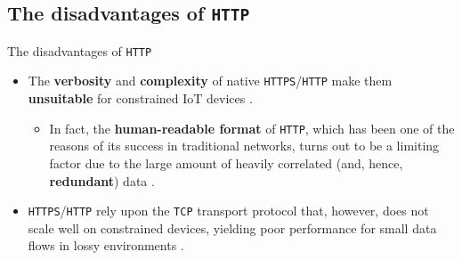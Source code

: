 \documentclass[10pt]{beamer}
\begin{document}
\subsection{The disadvantages of \texttt{HTTP}}
\begin{frame}{The disadvantages of \texttt{HTTP}}

\begin{itemize}
\justifying
\item The \textbf{verbosity} and \textbf{complexity} of native \texttt{HTTPS}/\texttt{HTTP} make them \textbf{unsuitable} for constrained IoT devices \cite{IOTCITY}. 

\begin{itemize}
\justifying
\item In fact, the \textbf{human-readable format} of \texttt{HTTP}, which has been one of the reasons of its success in traditional networks, turns out to be a limiting factor due to the large amount of heavily correlated (and, hence, \textbf{redundant}) data \cite{IOTCITY}.
\end{itemize}

\item \texttt{HTTPS}/\texttt{HTTP} rely upon the \texttt{TCP} transport protocol that, however, does not scale well on constrained devices, yielding poor performance for small data flows in lossy environments \cite{IOTCITY}.
\end{itemize}

\end{frame} 
\end{document}
